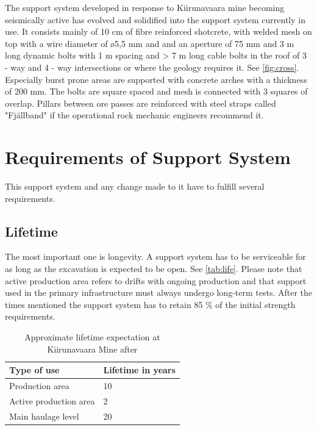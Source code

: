 The support system developed in response to Kiirunavaara mine becoming seismically active has evolved and solidified into the support system currently in use. It consists mainly of 10 cm of fibre reinforced shotcrete, with welded mesh on top with a wire diameter of \o 5,5 mm and and an aperture of 75 mm and 3 m long dynamic bolts with 1 m spacing and > 7 m long cable bolts in the roof of 3 - way and 4 - way intersections or where the geology requires it. See \autoref{fig:cross}.  Especially burst prone areas are supported with concrete arches with a thickness of 200 mm. The bolts are square spaced and mesh is connected with 3 squares of overlap. %
Pillars between ore passes are reinforced with steel straps called "Fjällband" if the operational rock mechanic engineers recommend it. \autocite{Jonson15}

\section{Requirements of Support System}
This support system and any change made to it have to fulfill several requirements.

\subsection{Lifetime}

The most important one is longevity. A support system has to be serviceable for as long as the excavation is expected to be open. See \autoref{tab:life}. Please note that active production area refers to drifts with ongoing production and that support used in the primary infrastructure must always undergo long-term tests. After the times mentioned the support system has to retain 85 \% of the initial strength requirements. \autocite[3]{Winsa18}

\begin{table}
    \centering
    \begin{tabular}{ll}
    \toprule
        Type of use & Lifetime in years \\
    \midrule
         Production area & 10  \\
         Active production area & 2 \\
         Main haulage level & 20 \\
    \bottomrule
    \end{tabular}
    \caption{Approximate lifetime expectation at Kiirunavaara Mine after \textcite[3]{Winsa18}}
    \label{tab:life}
\end{table}

